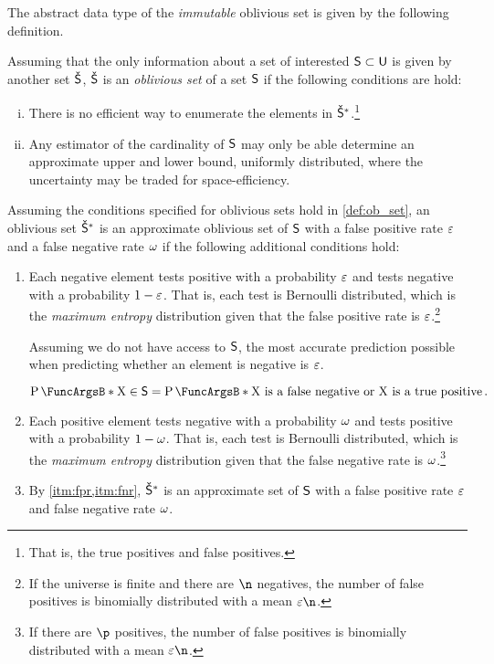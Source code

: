 \documentclass[ ../main.tex]{subfiles}
\begin{document}
The abstract data type of the \emph{immutable} oblivious set is given by the following definition.
\begin{definition}
\label{def:ob_set}
Assuming that the only information about a set of interested $\Set{S} \subset \Set{U}$ is given by another set $\OSet{S}$, $\OSet{S}$ is an \emph{oblivious set} of a set $\Set{S}$ if the following conditions are hold:
\begin{enumerate}[(i)]
    \item There is no efficient way to enumerate the elements in $\OASet{S}$.\footnote{That is, the true positives and false positives.}
    \item Any estimator of the cardinality of $\Set{S}$ may only be able determine an approximate upper and lower bound, uniformly distributed, where the uncertainty may be traded for space-efficiency.
\end{enumerate}
\end{definition}

\begin{definition}
Assuming the conditions specified for oblivious sets hold in \cref{def:ob_set}, an oblivious set $\OASet{S}$ is an approximate oblivious set of $\Set{S}$ with a false positive rate $\varepsilon$ and a false negative rate $\omega$ if the following additional conditions hold:
\begin{enumerate}
    \item\label{itm:fpr} Each negative element tests positive with a probability $\varepsilon$ and tests negative with a probability $1-\varepsilon$. That is, each test is Bernoulli distributed, which is the \emph{maximum entropy} distribution given that the false positive rate is $\varepsilon$.\footnote{If the universe is finite and there are $\n$ negatives, the number of false positives is binomially distributed with a mean $\fprate \n$.}
    
    Assuming we do not have access to $\Set{S}$, the most accurate prediction possible when predicting whether an element is negative is $\varepsilon$.
    
    \begin{equation}
        \Prob{\RV{X} \in \Set{S}} = \Prob{\text{$\RV{X}$ is a false negative or $\RV{X}$ is a true positive}}\,.
    \end{equation}
    
    \item\label{itm:fnr} Each positive element tests negative with a probability $\omega$ and tests positive with a probability $1-\omega$. That is, each test is Bernoulli distributed, which is the \emph{maximum entropy} distribution given that the false negative rate is $\omega$.\footnote{If there are $\p$ positives, the number of false positives is binomially distributed with a mean $\fprate \n$.}
    
    \item By \cref{itm:fpr,itm:fnr}, $\OASet{S}$ is an approximate set\cite{aset} of $\Set{S}$ with a false positive rate $\varepsilon$ and false negative rate $\omega$.
\end{enumerate}
\end{definition}
\end{document}
